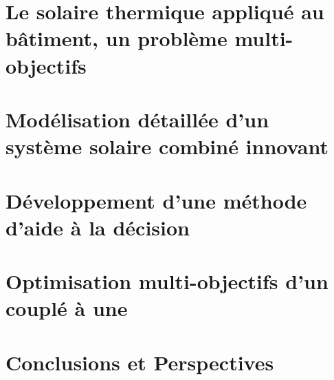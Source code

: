 \documentclass[11pt, twoside, openright]{JeremyThesis}
\begin{document}
\chapter{Le solaire thermique appliqué au bâtiment, un problème multi-objectifs}


\chapter{Modélisation détaillée d’un système solaire combiné innovant}


\chapter{Développement d’une méthode d’aide à la décision}


\chapter{Optimisation multi-objectifs d’un  couplé à une }


\chapter*{Conclusions et Perspectives}
%
%



\clearpage
\thesisPrintbibliography



\end{document}
